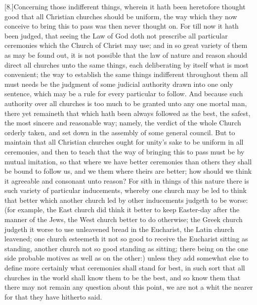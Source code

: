 [8.]Concerning those indifferent things, wherein it hath been heretofore thought good that all Christian churches should be uniform, the way which they now conceive to bring this to pass was then never thought on. For till now it hath been judged, that seeing the Law of God doth not prescribe all particular ceremonies which the Church of Christ may use; and in so great variety of them as may be found out, it is not possible that the law of nature and reason should direct all churches unto the same things, each deliberating by itself what is most convenient; the way to establish the same things indifferent throughout them all must needs be the judgment of some judicial authority drawn into one only sentence, which may be a rule for every particular to follow. And because such authority over all churches is too much to be granted unto any one mortal man, there yet remaineth that which hath been always followed as the best, the safest, the most sincere and reasonable way; namely, the verdict of the whole Church orderly taken, and set down in the assembly of some general council. But to maintain that all Christian churches ought for unity’s sake to be uniform in all ceremonies, and then to teach that the way of bringing this to pass must be by mutual imitation, so that where we have better ceremonies than others they shall be bound to follow us, and we them where theirs are better; how should we think it agreeable and consonant unto reason? For sith in things of this nature there is such variety of particular inducements, whereby one church may be led to think that better which another church led by other inducements judgeth to be worse: (for example, the East church did think it better to keep Easter-day after the manner of the Jews, the West church better to do otherwise; the Greek church judgeth it worse to use unleavened bread in the Eucharist, the Latin church leavened; one church esteemeth it not so good to receive the Eucharist sitting as standing, another church not so good standing as sitting; there being on the one side probable motives as well as on the other:) unless they add somewhat else to define more certainly what ceremonies shall stand for best, in such sort that all churches in  the world shall know them to be the best, and so know them that there may not remain any question about this point, we are not a whit the nearer for that they have hitherto said.

